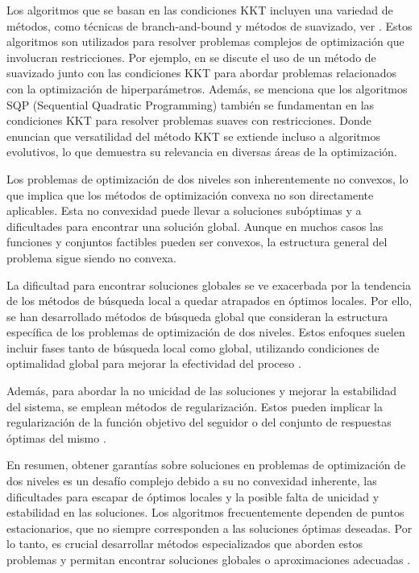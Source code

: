 Los algoritmos que se basan en las condiciones KKT incluyen una variedad de métodos, como técnicas de branch-and-bound y métodos de suavizado, ver \cite{DempeyZemkoho2020}. 
Estos algoritmos son utilizados para resolver problemas complejos de optimización que involucran restricciones. Por ejemplo, en \cite{DempeyZemkoho2020} se discute el uso de un método de suavizado junto con las condiciones KKT para abordar problemas relacionados con la optimización de hiperparámetros. Además, se menciona que los algoritmos SQP (Sequential Quadratic Programming) también se fundamentan en las condiciones KKT para resolver problemas suaves con restricciones. Donde enuncian que versatilidad del método KKT se extiende incluso a algoritmos evolutivos, lo que demuestra su relevancia en diversas áreas de la optimización.

Los problemas de optimización de dos niveles son inherentemente no convexos, lo que implica que los métodos de optimización convexa no son directamente aplicables. Esta no convexidad puede llevar a soluciones subóptimas y a dificultades para encontrar una solución global. Aunque en muchos casos las funciones y conjuntos factibles pueden ser convexos, la estructura general del problema sigue siendo no convexa.

La dificultad para encontrar soluciones globales se ve exacerbada por la tendencia de los métodos de búsqueda local a quedar atrapados en óptimos locales. Por ello, se han desarrollado métodos de búsqueda global que consideran la estructura específica de los problemas de optimización de dos niveles. Estos enfoques suelen incluir fases tanto de búsqueda local como global, utilizando condiciones de optimalidad global para mejorar la efectividad del proceso \cite{DempeyZemkoho2020}.

Además, para abordar la no unicidad de las soluciones y mejorar la estabilidad del sistema, se emplean métodos de regularización. Estos pueden implicar la regularización de la función objetivo del seguidor o del conjunto de respuestas óptimas del mismo \cite{DempeyZemkoho2020}.

En resumen, obtener garantías sobre soluciones en problemas de optimización de dos niveles es un desafío complejo debido a su no convexidad inherente, las dificultades para escapar de óptimos locales y la posible falta de unicidad y estabilidad en las soluciones. Los algoritmos frecuentemente dependen de puntos estacionarios, que no siempre corresponden a las soluciones óptimas deseadas. Por lo tanto, es crucial desarrollar métodos especializados que aborden estos problemas y permitan encontrar soluciones globales o aproximaciones adecuadas \cite{DempeyZemkoho2020}.

